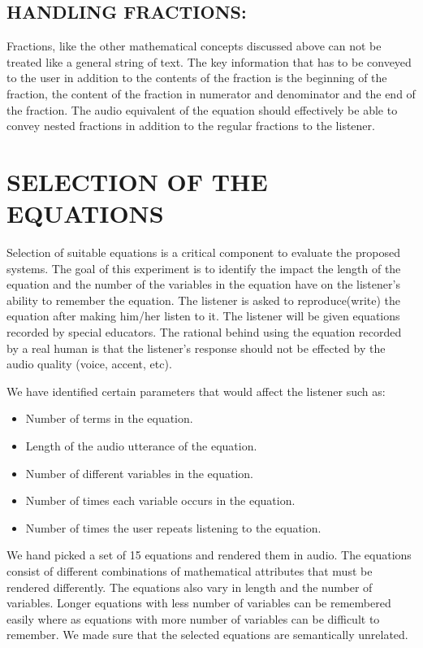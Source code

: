 \documentclass{article}
\begin{document}
\subsection{HANDLING FRACTIONS:}
\label{ssec:subsubhead}

Fractions, like the other mathematical concepts discussed above can not be treated like a general string of text. The key information that has to be conveyed to the user in addition to the contents of the fraction is the beginning of the fraction, the content of the fraction in numerator and denominator and the end of the fraction. The audio equivalent of the equation should effectively be able to convey nested fractions in addition to the regular fractions to the listener.


\section{SELECTION OF THE EQUATIONS}
\label{sec:typestyle}

Selection  of suitable equations is a critical component to evaluate the proposed systems. The goal of this experiment is to identify the impact the length of the equation and the number of the variables in the equation have on the listener’s ability to remember the equation. The listener is asked to reproduce(write) the equation after making him/her listen to it. The listener will be given equations recorded by special educators. The rational behind using the equation recorded by a real human is that the listener’s response should not be effected by the audio quality (voice, accent, etc). 

We have identified certain parameters that would affect the listener such as: 
 \begin{itemize}

 \item   Number of terms in the equation.
 \item   Length of the audio utterance of the equation.
 \item   Number of different variables in the equation.
 \item   Number of times each variable occurs in the equation.
 \item   Number of times the user repeats listening to the equation.

 \end{itemize}

We hand picked a set of 15 equations and rendered them in audio. The equations consist of different combinations of mathematical attributes that must be rendered differently. The equations also vary in length and the number of variables. Longer equations with less number of variables can be remembered easily where as equations with more number of variables can be difficult to remember. We made sure that the selected equations are semantically unrelated.
\end{document}
